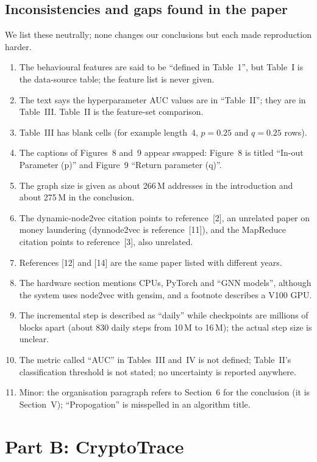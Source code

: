 \subsection{Inconsistencies and gaps found in the paper}
We list these neutrally; none changes our conclusions but each made reproduction harder.
\begin{enumerate}
\item The behavioural features are said to be ``defined in Table~1'', but Table~I is the data-source table; the feature list is never given.
\item The text says the hyperparameter AUC values are in ``Table~II''; they are in Table~III. Table~II is the feature-set comparison.
\item Table~III has blank cells (for example length~4, $p=0.25$ and $q=0.25$ rows).
\item The captions of Figures~8 and~9 appear swapped: Figure~8 is titled ``In-out Parameter (p)'' and Figure~9 ``Return parameter (q)''.
\item The graph size is given as about 266\,M addresses in the introduction and about 275\,M in the conclusion.
\item The dynamic-node2vec citation points to reference~[2], an unrelated paper on money laundering (dynnode2vec is reference~[11]), and the MapReduce citation points to reference~[3], also unrelated.
\item References [12] and [14] are the same paper listed with different years.
\item The hardware section mentions CPUs, PyTorch and ``GNN models'', although the system uses node2vec with gensim, and a footnote describes a V100 GPU.
\item The incremental step is described as ``daily'' while checkpoints are millions of blocks apart (about 830 daily steps from 10\,M to 16\,M); the actual step size is unclear.
\item The metric called ``AUC'' in Tables~III and~IV is not defined; Table~II's classification threshold is not stated; no uncertainty is reported anywhere.
\item Minor: the organisation paragraph refers to Section~6 for the conclusion (it is Section~V); ``Propogation'' is misspelled in an algorithm title.
\end{enumerate}

\section*{Part B: CryptoTrace}

